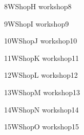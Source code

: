 \begin{wsschedule}
  {\WShopNameH}
  {8}{WShopH}
  {workshop8}
  {\WShopLocH}
  
\end{wsschedule}



\clearpage
{}

\begin{wsschedule}
  {\WShopNameI}
  {9}{WShopI}
  {workshop9}
  {\WShopLocI}
  
\end{wsschedule}

\begin{wsschedule}
  {\WShopNameJ}
  {10}{WShopJ}
  {workshop10}
  {\WShopLocJ}
  
\end{wsschedule}

\begin{wsschedule}
  {\WShopNameK}
  {11}{WShopK}
  {workshop11}
  {\WShopLocK}
  
\end{wsschedule}

\begin{wsschedule}
  {\WShopNameL}
  {12}{WShopL}
  {workshop12}
  {\WShopLocL}
  
\end{wsschedule}

\begin{wsschedule}
  {\WShopNameM}
  {13}{WShopM}
  {workshop13}
  {\WShopLocM}
  
\end{wsschedule}

\begin{wsschedule}
  {\WShopNameN}
  {14}{WShopN}
  {workshop14}
  {\WShopLocN}
  
\end{wsschedule}

\begin{wsschedule}
  {\WShopNameO}
  {15}{WShopO}
  {workshop15}
  {\WShopLocO}
  
\end{wsschedule}

\clearpage{\thispagestyle{emptyheader}\cleardoublepage}
